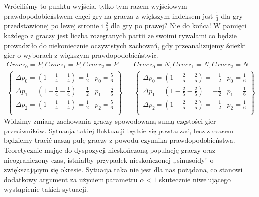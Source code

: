 Wróciliśmy to punktu wyjścia, tylko tym razem wyjściowym prawdopodobieństwem chęci gry na gracza z większym indeksem jest $\frac{1}{3}$ dla gry przedstawionej po lewej stronie i $\frac{2}{3}$ dla gry po prawej? Nie do końca! W pamięci każdego z graczy jest liczba rozegranych partii ze swoimi rywalami co będzie prowadziło do niekoniecznie oczywistych zachowań, gdy przeanalizujemy ścieżki gier o wyborach z większym prawdopodobieństwie.
\begin{align*}
Gracz_0 = P, Gracz_1 = P, Gracz_2 = P && Gracz_0 = N, Gracz_1 = N, Gracz_2 = N \\
\left\{
\begin{array}{ll}
\Delta p_0 = (1 - \frac{1}{4} - \frac{1}{4}) =  \frac{1}{2} & p_0= \frac{5}{6}\\
\Delta p_1 = (1 - \frac{1}{4} - \frac{1}{4}) =  \frac{1}{2} & p_1= \frac{5}{6}\\
\Delta p_2 = (1 - \frac{1}{4} - \frac{1}{4}) =  \frac{1}{2} & p_2= \frac{5}{6}\\
\end{array} 
\right\} &&
\left\{
\begin{array}{ll}
\Delta p_0 = (1 - \frac{2}{5} - \frac{2}{5}) =  -\frac{1}{2} & p_0= \frac{1}{6}\\
\Delta p_1 = (1 - \frac{2}{5} - \frac{2}{5}) =  -\frac{1}{2} & p_1= \frac{1}{6}\\
\Delta p_2 = (1 - \frac{2}{5} - \frac{2}{5}) =  -\frac{1}{2} & p_2= \frac{1}{6}\\
\end{array}
\right\}
\end{align*}
Widzimy zmianę zachowania graczy spowodowaną sumą częstości gier przeciwników. Sytuacja takiej fluktuacji będzie się powtarzać, lecz z czasem będziemy tracić naszą pulę graczy z powodu czynnika prawdopodobieństwa. Teoretycznie mając do dyspozycji nieskończoną populację graczy oraz nieograniczony czas, istniałby przypadek nieskończonej ,,sinusoidy'' o zwiększającym się okresie. Sytuacja taka nie jest dla nas pożądana, co stanowi dodatkowy argument za użyciem parametru $\alpha < 1$ skutecznie niwelującego wystąpienie takich sytuacji.
